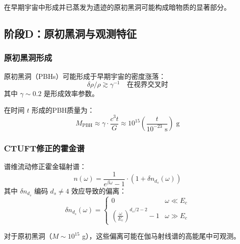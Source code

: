 \begin{proposition}[作为暗物质的遗迹]
在早期宇宙中形成并已蒸发为遗迹的原初黑洞可能构成暗物质的显著部分。
\end{proposition}

\subsection{阶段D：原初黑洞与观测特征}
\label{subsec:stageD_primordial}

\subsubsection{原初黑洞形成}

原初黑洞（PBHs）可能形成于早期宇宙的密度涨落：
\begin{equation}
\delta \rho/\rho \gtrsim \gamma^{-1} \quad \text{在视界交叉时}
\end{equation}
其中 $\gamma \sim 0.2$ 是形成效率参数。

在时间 $t$ 形成的PBH质量为：
\begin{equation}
M_{\text{PBH}} \approx \gamma \cdot \frac{c^3 t}{G} \approx 10^{15} \left(\frac{t}{10^{-23} \text{ s}}\right) \text{ g}
\end{equation}

\subsubsection{CTUFT修正的霍金谱}

\begin{theorem}[CTUFT修正霍金辐射谱]
谱维流动修正霍金辐射谱：
\begin{equation}
n(\omega) = \frac{1}{e^{\beta\omega} - 1} \cdot \left(1 + \delta n_{d_s}(\omega)\right)
\end{equation}
其中 $\delta n_{d_s}$ 编码 $d_s \neq 4$ 效应导致的偏离：
\begin{equation}
\delta n_{d_s}(\omega) = \begin{cases}
0 & \omega \ll E_c \\
\left(\frac{\omega}{E_c}\right)^{d_s/2 - 2} - 1 & \omega \gg E_c
\end{cases}
\end{equation}
\end{theorem}

对于原初黑洞（$M \sim 10^{15}$ g），这些偏离可能在伽马射线谱的高能尾中可观测。


